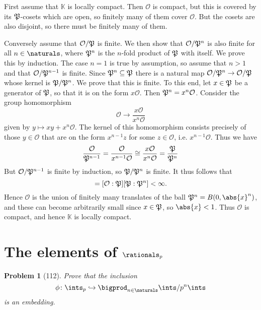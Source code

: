 \documentclass[a4paper, 11pt]{memoir}
\theoremstyle{plaincustomnumber}
\newtheorem{problem}{Problem}
\theoremstyle{changedotbreakcustomnumber}
\newcommand{\calO}{\mathcal{O}}
\newcommand{\fieldK}{\mathbb{K}}
\begin{document}
\begin{solution}
    First assume that $\fieldK$ is locally compact. Then $\calO$ is compact, but this is covered by its $\mathfrak{P}$-cosets which are open, so finitely many of them cover $\calO$. But the cosets are also disjoint, so there must be finitely many of them.

    Conversely assume that $\calO/\frakP$ is finite. We then show that $\calO/\frakP^n$ is also finite for all $n \in \naturals$, where $\mathfrak{P}^n$ is the $n$-fold product of $\mathfrak{P}$ with itself. We prove this by induction. The case $n = 1$ is true by assumption, so assume that $n > 1$ and that $\calO/\frakP^{n-1}$ is finite. Since $\mathfrak{P}^n \subseteq \mathfrak{P}$ there is a natural map $\calO/\frakP^n \to \calO/\frakP$ whose kernel is $\mathfrak{P}/\mathfrak{P}^n$. We prove that this is finite. To this end, let $x \in \mathfrak{P}$ be a generator of $\mathfrak{P}$, so that it is on the form $x\calO$. Then $\frakP^n = x^n \calO$. Consider the group homomorphism
    \begin{equation*}
        \calO \to \frac{x \calO}{x^n \calO}
    \end{equation*}
    given by $y \mapsto xy + x^n \calO$. The kernel of this homomorphism consists precisely of those $y \in \calO$ that are on the form $x^{n-1}z$ for some $z \in \calO$, i.e. $x^{n-1} \calO$. Thus we have
    \begin{equation*}
        \frac{\calO}{\frakP^{n-1}}
            = \frac{\calO}{x^{n-1} \calO}
            \cong \frac{x \calO}{x^n \calO}
            = \frac{\frakP}{\frakP^n}
    \end{equation*}
    But $\calO / \frakP^{n-1}$ is finite by induction, so $\mathfrak{P} / \mathfrak{P}^n$ is finite. It thus follows that
    \begin{equation*}
        [\calO : \frakP^n]
            = [\calO : \frakP] [\frakP : \frakP^n] < \infty.
    \end{equation*}
    Hence $\calO$ is the union of finitely many translates of the ball $\frakP^n = B(0,\abs{x}^n)$, and these can become arbitrarily small since $x \in \mathfrak{P}$, so $\abs{x} < 1$. Thus $\calO$ is compact, and hence $\fieldK$ is locally compact.
\end{solution}


\section{The elements of $\rationals_p$}

\begin{problem}[112]
    Prove that the inclusion
    \begin{equation*}
        \phi \colon \ints_p \hookrightarrow \bigprod_{n \in \naturals} \ints / p^n \ints
    \end{equation*}
    is an embedding.
\end{problem}
\end{document}
